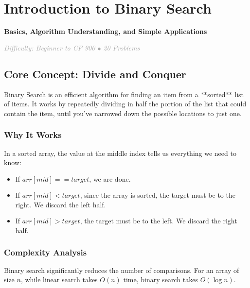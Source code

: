 \documentclass[11pt,a4paper,oneside]{book}
\begin{document}
\chapter{Introduction to Binary Search}

\begin{tcolorbox}[
    enhanced,
    colback=white,
    colframe=secondaryblue,
    boxrule=1pt,
    arc=2mm,
    left=10pt,
    right=10pt
]
\textbf{\large\textcolor{primaryblue}{Basics, Algorithm Understanding, and Simple Applications}}
\end{tcolorbox}

\vspace{0.5cm}

\begin{center}
\textit{\textcolor{darkgray}{Difficulty: Beginner to CF 900 $\bullet$ 20 Problems}}
\end{center}

\section{Core Concept: Divide and Conquer}

Binary Search is an efficient algorithm for finding an item from a **sorted** list of items. It works by repeatedly dividing in half the portion of the list that could contain the item, until you've narrowed down the possible locations to just one.



\subsection{Why It Works}
In a sorted array, the value at the middle index tells us everything we need to know:
\begin{itemize}
    \item If $arr[mid] == target$, we are done.
    \item If $arr[mid] < target$, since the array is sorted, the target must be to the right. We discard the left half.
    \item If $arr[mid] > target$, the target must be to the left. We discard the right half.
\end{itemize}

\subsection{Complexity Analysis}
Binary search significantly reduces the number of comparisons. For an array of size $n$, while linear search takes $O(n)$ time, binary search takes $O(\log n)$. 
\end{document}
